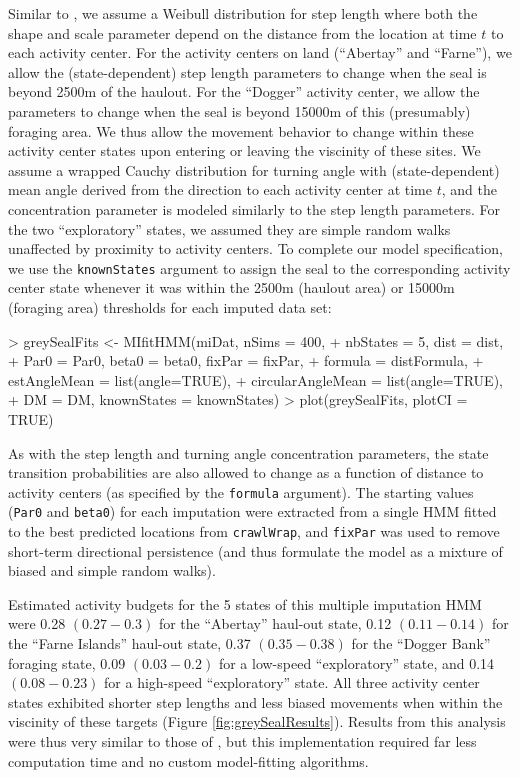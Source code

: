 \documentclass[12pt]{article}
\begin{document}
Similar to \cite{McClintockEtAl2012}, we assume a Weibull distribution for step length where both the shape and scale parameter depend on the distance from the location at time $t$ to each activity center. For the activity centers on land (``Abertay'' and ``Farne''), we allow the (state-dependent) step length parameters to change when the seal is beyond 2500m of the haulout. For the ``Dogger'' activity center, we allow the parameters to change when the seal is beyond 15000m of this (presumably) foraging area. We thus allow the movement behavior to change within these activity center states upon entering or leaving the viscinity of these sites.  We assume a wrapped Cauchy distribution for turning angle with (state-dependent) mean angle derived from the direction to each activity center at time $t$, and the concentration parameter is modeled similarly to the step length parameters. For the two ``exploratory'' states, we assumed they are simple random walks unaffected by proximity to activity centers. To complete our model specification, we use the \verb|knownStates| argument to assign the seal to the corresponding activity center state whenever it was within the 2500m (haulout area) or 15000m (foraging area) thresholds for each imputed data set:
\begin{Schunk}
\begin{Sinput}
> greySealFits <- MIfitHMM(miDat, nSims = 400,
+                          nbStates = 5, dist = dist,
+                          Par0 = Par0, beta0 = beta0, fixPar = fixPar,
+                          formula = distFormula,
+                          estAngleMean = list(angle=TRUE), 
+                          circularAngleMean = list(angle=TRUE),
+                          DM = DM, knownStates = knownStates)
> plot(greySealFits, plotCI = TRUE)
\end{Sinput}
\end{Schunk}
As with the step length and turning angle concentration parameters, the state transition probabilities are also allowed to change as a function of distance to activity centers (as specified by the \verb|formula| argument). The starting values (\verb|Par0| and \verb|beta0|) for each imputation were extracted from a single HMM fitted to the best predicted locations from \verb|crawlWrap|, and \verb|fixPar| was used to remove short-term directional persistence (and thus formulate the model as a mixture of biased and simple random walks). 

Estimated activity budgets for the 5 states of this multiple imputation HMM were 0.28 $(0.27-0.3)$ for the ``Abertay'' haul-out state, 0.12 $(0.11-0.14)$ for the ``Farne Islands'' haul-out state, 0.37 $(0.35-0.38)$ for the ``Dogger Bank'' foraging state, 0.09 $(0.03-0.2)$ for a low-speed ``exploratory'' state, and 0.14 $(0.08-0.23)$ for a high-speed ``exploratory'' state. All three activity center states exhibited shorter step lengths and less biased movements when within the viscinity of these targets (Figure \ref{fig:greySealResults}). Results from this analysis were thus very similar to those of \cite{McClintockEtAl2012}, but this implementation required far less computation time and no custom model-fitting algorithms. 
\end{document}
